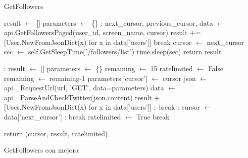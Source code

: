 
	\begin{algorithm}[H]
			\caption{GetFollowers}\label{getFollowers}
			\begin{algorithmic}[1]
			    \State result $\gets$ []
			    \State parameters $\gets$ \{\}
			    : \label{getFollowers:line:line4}
				    \State next\_cursor, previous\_cursor, data $\gets$ api.GetFollowersPaged(user\_id, screen\_name, cursor)
				    \State result += [User.NewFromJsonDict(x) for x in data['users']]
				    \label{getFollowers:line:line7}
					    \State break
				    \Else
					    \State cursor $\gets$ next\_cursor
				    \EndIf
				    \State sec $\gets$ self.GetSleepTime('/followers/list')
				    \State time.sleep(sec)
			    \EndWhile
				    \State return result
				\EndFunction				
			\end{algorithmic}
		\end{algorithm}

		\begin{algorithm}[H]
			\begin{algorithmic}[1]
				:
					\State result $\gets$ []
					\State parameters $\gets$ \{\}
				\color{orange}
				\State remaining $\gets$ 15
				\State ratelimited $\gets$ False
					\State remaining $\gets$ remaining-1
					\State parameters['cursor'] $\gets$ cursor
					\color{black}
					\State json $\gets$ api.\_RequestUrl(url, 'GET', data=parameters)
					\State data $\gets$ api.\_ParseAndCheckTwitter(json.content)
							\State result $+=$ [User.NewFromJsonDict(x) for x in data['users']]
						:
								\State break
							\Else:
								\State cursor $\gets$ data['next\_cursor']
							\EndIf
						\Else:
							\State break
						\EndIf
						\Else
						\color{orange}
							\State ratelimited $\gets$ True
							\State break
					\EndIf
					
				\EndWhile
				\State return (cursor, result, ratelimited)
				\color{black}
				\EndFunction
				
			\end{algorithmic}
			\caption{GetFollowers con mejora}\label{getFollowerModif}
		\end{algorithm}

